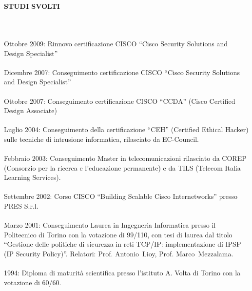 \documentclass[a4paper, 10pt]{article}
\begin{document}
\paragraph{STUDI SVOLTI}
\ \\
\ \\
Ottobre 2009: Rinnovo certificazione CISCO ``Cisco Security Solutions
and Design Specialist''
\\
\ \\
Dicembre 2007: Conseguimento certificazione CISCO ``Cisco Security Solutions
and Design Specialist''
\\
\ \\
Ottobre 2007: Conseguimento certificazione CISCO ``CCDA'' (Cisco Certified
Design Associate)
\\
\ \\
Luglio 2004: Conseguimento della certificazione ``CEH'' (Certified Ethical
Hacker) sulle tecniche di intrusione informatica, rilasciato da EC-Council.
\\
\ \\
Febbraio 2003: Conseguimento Master in telecomunicazioni rilasciato da
COREP (Consorzio per la ricerca e l'educazione permanente) e da TILS
(Telecom Italia Learning Services).
\\
\ \\
Settembre 2002: Corso CISCO ``Building Scalable Cisco Internetworks'' presso
PRES S.r.l.
\\
\ \\
Marzo 2001: Conseguimento Laurea in Ingegneria Informatica presso il
Politecnico di Torino con la votazione di
99/110, con tesi di laurea dal titolo ``Gestione delle politiche di sicurezza in reti TCP/IP:
implementazione di IPSP (IP Security Policy)''. 
Relatori: Prof. \mbox{Antonio Lioy}, Prof. \mbox{Marco Mezzalama}.
\\
\ \\
1994: Diploma di maturit\`a scientifica presso l'istituto A. Volta di Torino
con la votazione di 60/60.
\\
\end{document}
